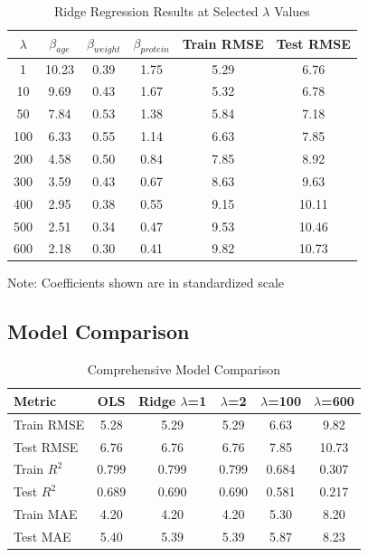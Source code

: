 \documentclass{article}
\begin{document}
\begin{table}[h]
    \centering
    \caption{Ridge Regression Results at Selected $\lambda$ Values}
    \label{tab:ridge_results}
    \begin{tabular}{cccccc}
        \toprule
        $\lambda$ & $\beta_{age}$ & $\beta_{weight}$ & $\beta_{protein}$ & Train RMSE & Test RMSE \\
        \midrule
        1 & 10.23 & 0.39 & 1.75 & 5.29 & 6.76 \\
        10 & 9.69 & 0.43 & 1.67 & 5.32 & 6.78 \\
        50 & 7.84 & 0.53 & 1.38 & 5.84 & 7.18 \\
        100 & 6.33 & 0.55 & 1.14 & 6.63 & 7.85 \\
        200 & 4.58 & 0.50 & 0.84 & 7.85 & 8.92 \\
        300 & 3.59 & 0.43 & 0.67 & 8.63 & 9.63 \\
        400 & 2.95 & 0.38 & 0.55 & 9.15 & 10.11 \\
        500 & 2.51 & 0.34 & 0.47 & 9.53 & 10.46 \\
        600 & 2.18 & 0.30 & 0.41 & 9.82 & 10.73 \\
        \bottomrule
    \end{tabular}
    \vspace{0.2cm}
    
    \footnotesize{Note: Coefficients shown are in standardized scale}
\end{table}

\clearpage
\subsection{Model Comparison}

\begin{table}[h]
    \centering
    \caption{Comprehensive Model Comparison}
    \label{tab:comparison}
    \begin{tabular}{lccccc}
        \toprule
        \textbf{Metric} & \textbf{OLS} & \textbf{Ridge $\lambda$=1} & \textbf{$\lambda$=2} & \textbf{$\lambda$=100} & \textbf{$\lambda$=600} \\
        \midrule
        Train RMSE & 5.28 & 5.29 & 5.29 & 6.63 & 9.82 \\
        Test RMSE & 6.76 & 6.76 & 6.76 & 7.85 & 10.73 \\
        Train $R^2$ & 0.799 & 0.799 & 0.799 & 0.684 & 0.307 \\
        Test $R^2$ & 0.689 & 0.690 & 0.690 & 0.581 & 0.217 \\
        Train MAE & 4.20 & 4.20 & 4.20 & 5.30 & 8.20 \\
        Test MAE & 5.40 & 5.39 & 5.39 & 5.87 & 8.23 \\
        \bottomrule
    \end{tabular}
\end{table}
\end{document}
